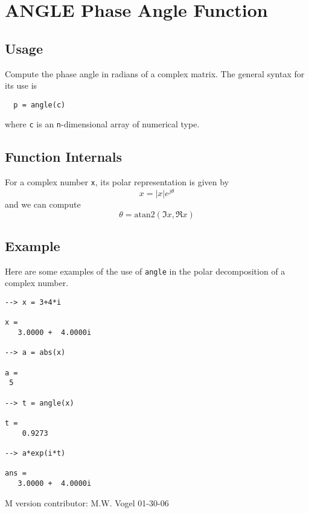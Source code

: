 \section{ANGLE Phase Angle Function
}

\subsection{Usage}

Compute the phase angle in radians of a complex matrix.  The general
syntax for its use is
\begin{verbatim}
  p = angle(c)
\end{verbatim}
where \verb|c| is an \verb|n|-dimensional array of numerical type.
\subsection{Function Internals}

For a complex number \verb|x|, its polar representation is
given by
\[
  x = |x| e^{j\theta}
\]
and we can compute 
\[
  \theta = \mathrm{atan2}(\Im x, \Re x)
\]
\subsection{Example}

Here are some examples of the use of \verb|angle| in the polar decomposition
of a complex number.
\begin{verbatim}
--> x = 3+4*i

x = 
   3.0000 +  4.0000i 

--> a = abs(x)

a = 
 5 

--> t = angle(x)

t = 
    0.9273 

--> a*exp(i*t)

ans = 
   3.0000 +  4.0000i 
\end{verbatim}
   M version contributor: M.W. Vogel 01-30-06
